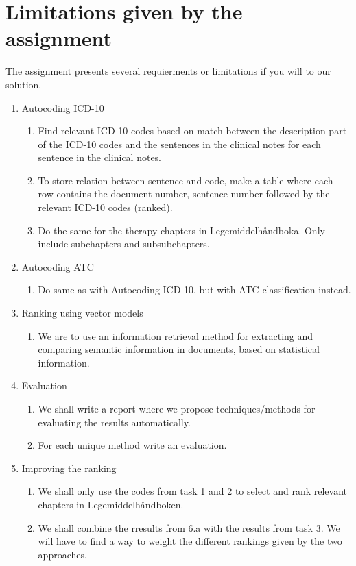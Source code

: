 \chapter{Limitations given by the assignment}
The assignment presents several requierments or limitations if you will to  our solution.
\begin{enumerate}
\item{Autocoding ICD-10}
\begin{enumerate}
\item{Find relevant ICD-10 codes based on match between the description part of the ICD-10 codes and the sentences in the clinical notes for each sentence in the clinical notes.}
\item{To store relation between sentence and code, make a table where each row contains the document number, sentence number followed by the relevant ICD-10 codes (ranked).}
\item{Do the same for the therapy chapters in Legemiddelhåndboka. Only include subchapters and subsubchapters.}
\end{enumerate}
\item{Autocoding ATC}
\begin{enumerate}
\item{Do same as with Autocoding ICD-10, but with ATC classification instead.}
\end{enumerate}
\item{Ranking using vector models}
\begin{enumerate}
\item{We are to use an information retrieval method for extracting and comparing semantic information in documents, based on statistical information.}
\end{enumerate}
\item{Evaluation}
\begin{enumerate}
\item{We shall write a report where we propose techniques/methods for evaluating the results automatically.}
\item{For each unique method write an evaluation.}
\end{enumerate}
\item{Improving the ranking}
\begin{enumerate}
\item{We shall only use the codes from task 1 and 2 to select and rank relevant chapters in Legemiddelhåndboken.}
\item{We shall combine the rresults from 6.a with the results from task 3. We will have to find a way to weight the different rankings given by the two approaches.}

\end{enumerate}
\end{enumerate}

